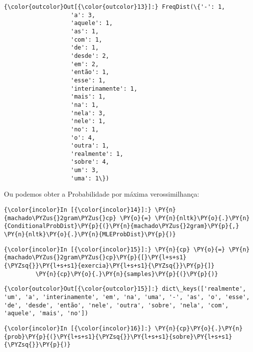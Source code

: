             \begin{Verbatim}[commandchars=\\\{\}]
{\color{outcolor}Out[{\color{outcolor}13}]:} FreqDist(\{'-': 1,
                   'a': 3,
                   'aquele': 1,
                   'as': 1,
                   'com': 1,
                   'de': 1,
                   'desde': 2,
                   'em': 2,
                   'então': 1,
                   'esse': 1,
                   'interinamente': 1,
                   'mais': 1,
                   'na': 1,
                   'nela': 3,
                   'nele': 1,
                   'no': 1,
                   'o': 4,
                   'outra': 1,
                   'realmente': 1,
                   'sobre': 4,
                   'um': 3,
                   'uma': 1\})
\end{Verbatim}
        
    Ou podemos obter a Probabilidade por máxima verossimilhança:

    \begin{Verbatim}[commandchars=\\\{\}]
{\color{incolor}In [{\color{incolor}14}]:} \PY{n}{machado\PYZus{}2gram\PYZus{}cp} \PY{o}{=} \PY{n}{nltk}\PY{o}{.}\PY{n}{ConditionalProbDist}\PY{p}{(}\PY{n}{machado\PYZus{}2gram}\PY{p}{,} \PY{n}{nltk}\PY{o}{.}\PY{n}{MLEProbDist}\PY{p}{)}
\end{Verbatim}

    \begin{Verbatim}[commandchars=\\\{\}]
{\color{incolor}In [{\color{incolor}15}]:} \PY{n}{cp} \PY{o}{=} \PY{n}{machado\PYZus{}2gram\PYZus{}cp}\PY{p}{[}\PY{l+s+s1}{\PYZsq{}}\PY{l+s+s1}{exercia}\PY{l+s+s1}{\PYZsq{}}\PY{p}{]}
         \PY{n}{cp}\PY{o}{.}\PY{n}{samples}\PY{p}{(}\PY{p}{)}
\end{Verbatim}

            \begin{Verbatim}[commandchars=\\\{\}]
{\color{outcolor}Out[{\color{outcolor}15}]:} dict\_keys(['realmente', 'um', 'a', 'interinamente', 'em', 'na', 'uma', '-', 'as', 'o', 'esse', 'de', 'desde', 'então', 'nele', 'outra', 'sobre', 'nela', 'com', 'aquele', 'mais', 'no'])
\end{Verbatim}
        
    \begin{Verbatim}[commandchars=\\\{\}]
{\color{incolor}In [{\color{incolor}16}]:} \PY{n}{cp}\PY{o}{.}\PY{n}{prob}\PY{p}{(}\PY{l+s+s1}{\PYZsq{}}\PY{l+s+s1}{sobre}\PY{l+s+s1}{\PYZsq{}}\PY{p}{)}
\end{Verbatim}

